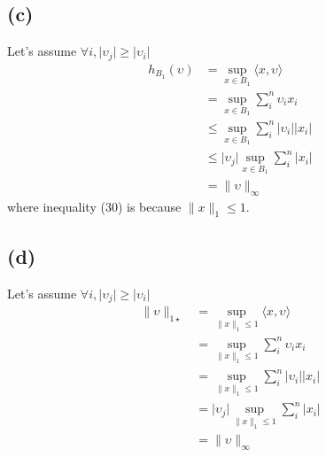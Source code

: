 \documentclass[12pt, a4 paper]{article}
\begin{document}
\begin{framed}
        \subsection{(c)}
        Let's assume $\forall i, \lvert \upsilon_{j} \rvert \geq \lvert \upsilon_{i} \rvert $
        \begin{align}
            h_{B_{1}}(\upsilon) &= \sup\limits_{x \in B_{1}} \langle x, \upsilon \rangle\\
            &=\sup\limits_{x \in B_{1}} \sum\limits_{i}^{n} \upsilon_{i}x_{i}\\
            &\leq \sup\limits_{x \in B_{1}} \sum\limits_{i}^{n} \lvert \upsilon_{i} \rvert
            \lvert x_{i} \rvert\\
            &\leq \lvert \upsilon_{j} \rvert \sup\limits_{x \in B_{1}} \sum_{i}^{n}
             \lvert x_{i} \rvert\\
            & = \lVert \upsilon \rVert_{\infty} 
        \end{align}
        \indent where inequality (30) is because $\lVert x \rVert_{1} \leq 1$.

        \subsection{(d)}
        Let's assume $\forall i, \lvert \upsilon_{j} \rvert \geq \lvert \upsilon_{i} \rvert $
        \begin{align}
            \lVert \upsilon \rVert_{1\star} &= \sup\limits_{ \lVert x \rVert_{1}\leq 1 }
            \langle x, \upsilon \rangle\\
            &= \sup\limits_{ \lVert x \rVert_{1}\leq 1 } \sum_{i}^{n} \upsilon_{i}x_{i}\\
            &= \sup\limits_{ \lVert x \rVert_{1}\leq 1 } \sum_{i}^{n} \lvert \upsilon_{i}
             \rvert \lvert x_{i} \rvert\\
            &= \lvert \upsilon_{j} \rvert \sup\limits_{ \lVert x \rVert_{1}\leq 1 }
            \sum_{i}^{n} \lvert x_{i} \rvert\\
            &= \lVert \upsilon \rVert_{\infty}
        \end{align}


\end{framed}
\end{document}
